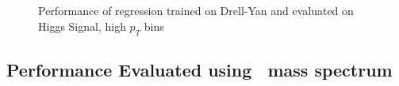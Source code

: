 \documentclass{cmspaper}
\begin{document}
\begin{figure}[h]
\centering
	 \\
	 \\
	\caption{Performance of regression trained on Drell-Yan and evaluated on Higgs Signal, high $p_T$ bins}
	\label{fig:drellyanCrossHiggssignalEnergyResponse3}
\end{figure}

\subsection{Performance Evaluated using \ZToEE\ mass spectrum} 
\label{subsec:zeesamplesperformance}
\end{document}
